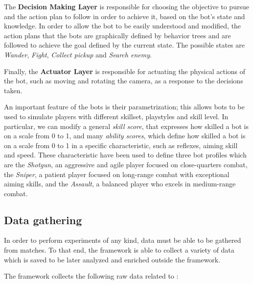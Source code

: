 \documentclass{Configuration_Files/PoliMi3i_thesis}
\begin{document}
The \textbf{Decision Making Layer} is responsible for choosing the objective to pursue and the action plan to follow in order to achieve it, based on the bot's state and knowledge. In order to allow the bot to be easily understood and modified, the action plans that the bots are graphically defined by behavior trees and are followed to achieve the goal defined by the current state. The possible states are \textit{Wander}, \textit{Fight}, \textit{Collect pickup} and \textit{Search enemy}. 

Finally, the \textbf{Actuator Layer} is responsible for actuating the physical actions of the bot, such as moving and rotating the camera, as a response to the decisions taken.

An important feature of the bots is their parametrization; this allows bots to be used to simulate players with different skillset, playstyles and skill level. In particular, we can modify a general \textit{skill score}, that expresses how skilled a bot is on a scale from 0 to 1, and many \textit{ability scores}, which define how skilled a bot is on a scale from 0 to 1 in a specific characteristic, such as reflexes, aiming skill and speed. These characteristic have been used to define three bot profiles which are the \textit{Shotgun}, an aggressive and agile player focused on close-quarters combat, the \textit{Sniper}, a patient player focused on long-range combat with exceptional aiming skills, and the \textit{Assault}, a balanced player who excels in medium-range combat.

\subsection{Data gathering}
\label{subsec:pa_data_gathering}
In order to perform experiments of any kind, data must be able to be gathered from matches. To that end, the framework is able to collect a variety of data which is saved to be later analyzed and enriched outside the framework.

The framework collects the following raw data related to :
\end{document}
